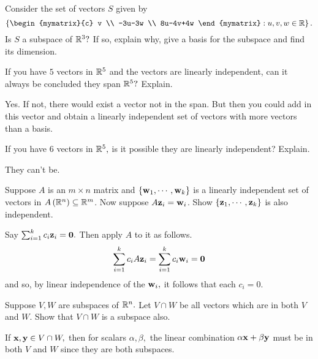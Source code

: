 \begin{enumialphparenastyle}
\begin{ex} Consider the set of vectors $S$ given by  
\begin{equation*}
\set{\begin{mymatrix}{c}
v \\ 
-3u-3w \\ 
8u-4v+4w
\end{mymatrix} :u,v,w\in \R} .
\end{equation*}
Is $S$ a subspace of $\mathbb{R}^{3}?$ If so, explain why,
give a basis for the subspace and find its dimension.
\end{ex}

\begin{ex} If you have $5$ vectors in $\mathbb{R}^{5}$ and the vectors are
linearly independent, can it always be concluded they span $\mathbb{R}^{5}?$
Explain. 
\begin{sol}
 Yes. If not, there would exist a vector not in the span. But then
you could add in this vector and obtain a linearly independent set of
vectors with more vectors than a basis.
\end{sol}
\end{ex}

\begin{ex} If you have $6$ vectors in $\mathbb{R}^{5},$ is it possible they are
linearly independent? Explain.
\begin{sol}
They can't be.
\end{sol}
\end{ex}


\begin{ex} Suppose $A$ is an $m\times n$ matrix and $\left\{{\bf w}
_{1},\cdots ,{\bf w}_{k}\right\} $ is a linearly independent set of
vectors in $A\left(\mathbb{R}^{n}\right) \subseteq \mathbb{R}^{m}$. Now
suppose $A{\bf z}_{i}={\bf w}_{i}$. Show $\left\{
{\bf z}_{1},\cdots ,{\bf z}_{k}\right\} $ is also independent. 
\begin{sol}
 Say $
\sum_{i=1}^{k}c_{i}{\bf z}_{i}={\bf 0}.$ Then apply $A$ to it as follows.
\[
\sum_{i=1}^{k}c_{i}A{\bf z}_{i}=\sum_{i=1}^{k}c_{i}{\bf w}_{i}={\bf 0}
\]
and so, by linear independence of the ${\bf w}_{i},$ it follows that each
$c_{i}=0$.
\end{sol}
\end{ex}

\begin{ex} Suppose $V, W$ are subspaces of $\mathbb{R}^{n}.$ Let $V\cap W$
be all vectors which are in both $V$ and $W$. Show that $V \cap W$ is a subspace also. 
\begin{sol}
If ${\bf x}, {\bf y}\in V\cap W,$ then for scalars $\alpha
,\beta ,$ the linear combination $\alpha {\bf x}+\beta {\bf y}$ must
be in both $V$ and $W$ since they are both subspaces.
\end{sol}
\end{ex}


\end{enumialphparenastyle}
